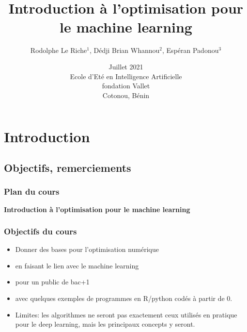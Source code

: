 \documentclass[12pt]{beamer}
\begin{document}
\title
[~Optimisation pour le machine learning
]
{Introduction à l'optimisation pour le machine learning}
\author
[Le Riche et al.]
{\large Rodolphe Le Riche$^1$, Dédji Brian Whannou$^2$, Espéran Padonou$^3$} 
\date[Juillet 2021]{Juillet 2021 \\
Ecole d'Eté en Intelligence Artificielle \\
fondation Vallet\\
Cotonou, Bénin} 
\begin{frame}
\titlepage
\end{frame}

\section{Introduction}
\subsection{Objectifs, remerciements}

\begin{frame}%
\frametitle{Plan du cours} 
\begin{center} \textbf{Introduction à l'optimisation pour le machine learning} \end{center}
\tableofcontents[currentsection]
\end{frame}

\begin{frame}
\frametitle{Objectifs du cours}
\begin{itemize}
\item Donner des bases pour l'optimisation numérique
\item en faisant le lien avec le machine learning
\item pour un public de bac+1
\item avec quelques exemples de programmes en R/python codés à partir de 0.
\item Limites: les algorithmes ne seront pas exactement ceux utilisés en pratique pour le deep learning, mais les principaux concepts y seront.
\end{itemize}
\end{frame}
\end{document}
